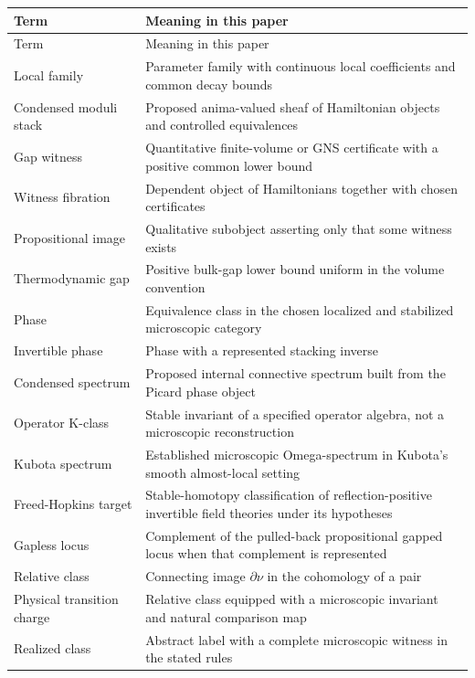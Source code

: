 \documentclass[12pt]{article}
\theoremstyle{definition}
\theoremstyle{remark}
\begin{document}
\begin{longtable}{>{\raggedright\arraybackslash}p{}
                  >{\raggedright\arraybackslash}p{}}
\toprule
Term & Meaning in this paper \\
\midrule
\endfirsthead
\toprule
Term & Meaning in this paper \\
\midrule
\endhead
Local family & Parameter family with continuous local coefficients and common decay bounds \\
Condensed moduli stack & Proposed anima-valued sheaf of Hamiltonian objects and controlled equivalences \\
Gap witness & Quantitative finite-volume or GNS certificate with a positive common lower bound \\
Witness fibration & Dependent object of Hamiltonians together with chosen certificates \\
Propositional image & Qualitative subobject asserting only that some witness exists \\
Thermodynamic gap & Positive bulk-gap lower bound uniform in the volume convention \\
Phase & Equivalence class in the chosen localized and stabilized microscopic category \\
Invertible phase & Phase with a represented stacking inverse \\
Condensed spectrum & Proposed internal connective spectrum built from the Picard phase object \\
Operator K-class & Stable invariant of a specified operator algebra, not a microscopic reconstruction \\
Kubota spectrum & Established microscopic Omega-spectrum in Kubota's smooth almost-local setting \\
Freed-Hopkins target & Stable-homotopy classification of reflection-positive invertible field theories under its hypotheses \\
Gapless locus & Complement of the pulled-back propositional gapped locus when that complement is represented \\
Relative class & Connecting image $\partial\nu$ in the cohomology of a pair \\
Physical transition charge & Relative class equipped with a microscopic invariant and natural comparison map \\
Realized class & Abstract label with a complete microscopic witness in the stated rules \\
\bottomrule
\end{longtable}
\end{document}

